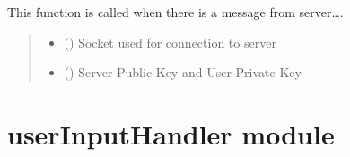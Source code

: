 \documentclass[letterpaper,10pt,english]{sphinxmanual}
\begin{document}
\begin{fulllineitems}
\label{\detokenize{app:app.handleMessageFromServer}}
\pysigstartsignatures
{}
\pysigstopsignatures
\sphinxAtStartPar
This function is called when there is a message from server….
\begin{quote}\begin{description}
\begin{itemize}
\item {} 
\sphinxAtStartPar
{} () \textendash{} Socket used for connection to server

\item {} 
\sphinxAtStartPar
{} () \textendash{} Server Public Key and User Private Key

\end{itemize}

\end{description}\end{quote}

\end{fulllineitems}


\sphinxstepscope


\section{userInputHandler module}
\label{\detokenize{userInputHandler:module-userInputHandler}}\label{\detokenize{userInputHandler:userinputhandler-module}}\label{\detokenize{userInputHandler::doc}}
\end{document}

